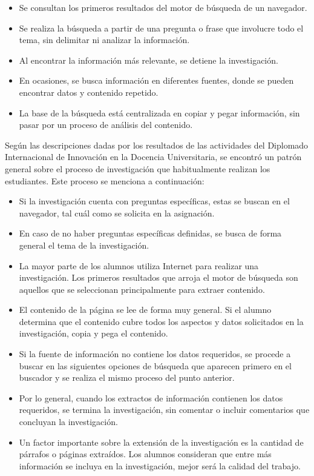 \begin{itemize}
  \item Se consultan los primeros resultados del motor de búsqueda de un navegador.
  \item Se realiza la búsqueda a partir de una pregunta o frase que involucre todo el tema, sin delimitar ni analizar la información.
  \item Al encontrar la información más relevante, se detiene la investigación.
  \item En ocasiones, se busca información en diferentes fuentes, donde se pueden encontrar datos y contenido repetido.
  \item La base de la búsqueda está centralizada en copiar y pegar información, sin pasar por un proceso de análisis del contenido.
\end{itemize}

Según las descripciones dadas por los resultados de las actividades del Diplomado Internacional de Innovación en la Docencia Universitaria, se encontró un patrón general sobre el proceso de investigación que habitualmente realizan los estudiantes. Este proceso se menciona a continuación:

\begin{itemize}
  \item Si la investigación cuenta con preguntas específicas, estas se buscan en el navegador, tal cuál como se solicita en la asignación.
  \item En caso de no haber preguntas específicas definidas, se busca de forma general el tema de la investigación.
  \item La mayor parte de los alumnos utiliza Internet para realizar una investigación. Los primeros resultados que arroja el motor de búsqueda son aquellos que se seleccionan principalmente para extraer contenido.
  \item El contenido de la página se lee de forma muy general. Si el alumno determina que el contenido cubre todos los aspectos y datos solicitados en la investigación, copia y pega el contenido.
  \item Si la fuente de información no contiene los datos requeridos, se procede a buscar en las siguientes opciones de búsqueda que aparecen primero en el buscador y se realiza el mismo proceso del punto anterior.
  \item Por lo general, cuando los extractos de información contienen los datos requeridos, se termina la investigación, sin comentar o incluir comentarios que concluyan la investigación.
  \item Un factor importante sobre la extensión de la investigación es la cantidad de párrafos o páginas extraídos. Los alumnos consideran que entre más información se incluya en la investigación, mejor será la calidad del trabajo.
\end{itemize}

